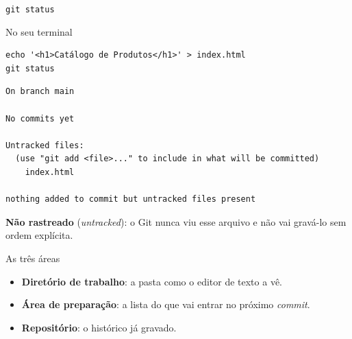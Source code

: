 \documentclass{beamer}
\newenvironment{noterminal}
  {\begin{exampleblock}{No seu terminal}}
  {\end{exampleblock}}
\begin{document}
\begin{frame}[fragile]{\texttt{git status}}
  \begin{noterminal}
    \begin{verbatim}
echo '<h1>Catálogo de Produtos</h1>' > index.html
git status
    \end{verbatim}
  \end{noterminal}

  \begin{verbatim}
On branch main

No commits yet

Untracked files:
  (use "git add <file>..." to include in what will be committed)
	index.html

nothing added to commit but untracked files present
  \end{verbatim}

  \textbf{Não rastreado} (\textit{untracked}): o Git nunca viu esse arquivo e
  não vai gravá-lo sem ordem explícita.
\end{frame}

\begin{frame}{As três áreas}
  \begin{center}
  \end{center}

  \begin{itemize}
    \item \textbf{Diretório de trabalho}: a pasta como o editor de texto a vê.
    \item \textbf{Área de preparação}: a lista do que vai entrar no próximo
          \textit{commit}.
    \item \textbf{Repositório}: o histórico já gravado.
  \end{itemize}
\end{frame}
\end{document}
